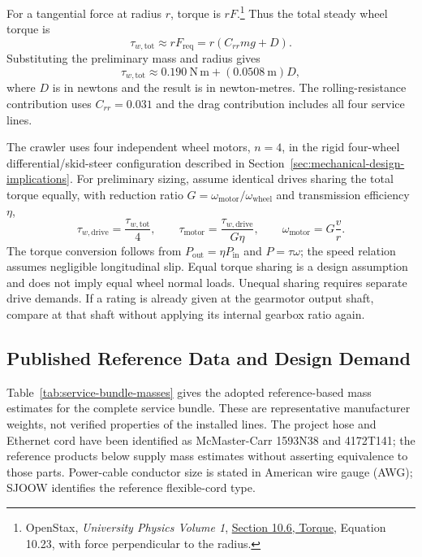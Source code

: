 For a tangential force at radius $r$, torque is $rF$.\footnote{OpenStax, \emph{University Physics Volume 1}, \href{https://openstax.org/books/university-physics-volume-1/pages/10-6-torque}{Section 10.6, Torque}, Equation 10.23, with force perpendicular to the radius.} Thus the total steady wheel torque is
\begin{equation}
 \tau_{w,\mathrm{tot}}\approx rF_{\mathrm{req}}=r(C_{rr}mg+D).
 \label{eq:wheel-torque-demand}
\end{equation}
Substituting the preliminary mass and radius gives
\begin{equation}
 \tau_{w,\mathrm{tot}}\approx 0.190~\mathrm{N\,m}+(0.0508~\mathrm{m})D,
 \label{eq:steady-wheel-torque-numeric}
\end{equation}
where $D$ is in newtons and the result is in newton-metres. The rolling-resistance contribution uses $C_{rr}=0.031$ and the drag contribution includes all four service lines.

The crawler uses four independent wheel motors, $n=4$, in the rigid four-wheel differential/skid-steer configuration described in Section~\ref{sec:mechanical-design-implications}. For preliminary sizing, assume identical drives sharing the total torque equally, with reduction ratio $G=\omega_{\mathrm{motor}}/\omega_{\mathrm{wheel}}$ and transmission efficiency $\eta$,
\begin{equation}
 \tau_{w,\mathrm{drive}}=\frac{\tau_{w,\mathrm{tot}}}{4}, \qquad
 \tau_{\mathrm{motor}}=\frac{\tau_{w,\mathrm{drive}}}{G\eta}, \qquad
 \omega_{\mathrm{motor}}=G\frac{v}{r}.
 \label{eq:motor-demand}
\end{equation}
The torque conversion follows from $P_{\mathrm{out}}=\eta P_{\mathrm{in}}$ and $P=\tau\omega$; the speed relation assumes negligible longitudinal slip. Equal torque sharing is a design assumption and does not imply equal wheel normal loads. Unequal sharing requires separate drive demands. If a rating is already given at the gearmotor output shaft, compare at that shaft without applying its internal gearbox ratio again.

\subsection{Published Reference Data and Design Demand}
\label{sec:bundle-design-calculation}
Table~\ref{tab:service-bundle-masses} gives the adopted reference-based mass estimates for the complete service bundle. These are representative manufacturer weights, not verified properties of the installed lines. The project hose and Ethernet cord have been identified as McMaster-Carr 1593N38 and 4172T141; the reference products below supply mass estimates without asserting equivalence to those parts. Power-cable conductor size is stated in American wire gauge (AWG); SJOOW identifies the reference flexible-cord type.

